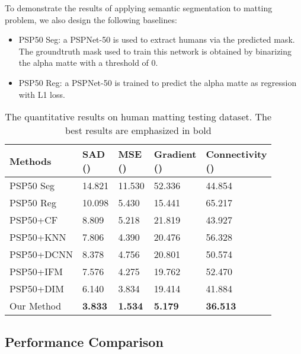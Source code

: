 To demonstrate the results of applying semantic segmentation to matting problem, we also design the following baselines:
\begin{itemize}
  \item PSP50 Seg: a PSPNet-50 is used to extract humans via the predicted mask. The groundtruth mask used to train this network is obtained by binarizing the alpha matte with a threshold of 0.
  \item PSP50 Reg: a PSPNet-50 is trained to predict the alpha matte as regression with L1 loss.
\end{itemize}



\begin{table}
	\caption{The quantitative results on human matting testing dataset. The best results are emphasized in bold}
	\label{tab:quan_res_hmtds_no_trimap}
	\begin{tabular}{lllll}
		\toprule
		Methods & \tabincell{c}{SAD \\ ()} & \tabincell{c}{MSE \\ ()} & \tabincell{c}{Gradient \\ ()} & \tabincell{c}{Connectivity \\ ()} \\
		\midrule
		PSP50 Seg & 14.821 & 11.530 & 52.336 & 44.854\\
PSP50 Reg & 10.098 & 5.430 & 15.441 & 65.217\\
PSP50+CF \cite{levin2008closed} & 8.809 & 5.218 & 21.819 & 43.927\\
		PSP50+KNN \cite{chen2013knn} & 7.806 & 4.390 & 20.476 & 56.328\\
		PSP50+DCNN \cite{cho2016natural} & 8.378 & 4.756 & 20.801 & 50.574\\
		PSP50+IFM \cite{aksoy2017designing} & 7.576 & 4.275 & 19.762 & 52.470\\
		PSP50+DIM \cite{xu2017deep} & 6.140 & 3.834 & 19.414 & 41.884\\
\midrule
Our Method & \textbf{3.833} & \textbf{1.534} & \textbf{5.179} & \textbf{36.513} \\
		\bottomrule
	\end{tabular}
\end{table}



\subsection{Performance Comparison}

